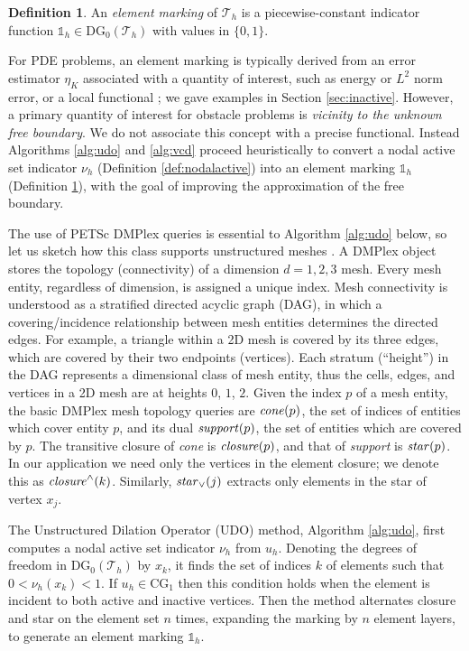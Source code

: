 \documentclass[]{interact}
\theoremstyle{plain}%
\theoremstyle{definition}
\newtheorem{definition}[theorem]{Definition}
\theoremstyle{remark}
\newcommand{\cT}{\mathcal{T}}
\newcommand{\CG}{\text{CG}}
\newcommand{\DG}{\text{DG}}
\newcommand{\oneh}{\mathbb{1}_h}
\begin{document}
\begin{definition} \label{def:marking}
An \emph{element marking} of $\cT_h$ is a piecewise-constant indicator function $\oneh \in \DG_0(\cT_h)$ with values in $\{0,1\}$.
\end{definition}

For PDE problems, an element marking is typically derived from an error estimator $\eta_K$ associated with a quantity of interest, such as energy or $L^2$ norm error, or a local functional \cite{BangerthRannacher2003}; we gave examples in Section \ref{sec:inactive}.  However, a primary quantity of interest for obstacle problems is \emph{vicinity to the unknown free boundary}.  We do not associate this concept with a precise functional.  Instead Algorithms \ref{alg:udo} and \ref{alg:vcd} proceed heuristically to convert a nodal active set indicator $\nu_h$ (Definition \ref{def:nodalactive}) into an element marking $\oneh$ (Definition \ref{def:marking}), with the goal of improving the approximation of the free boundary.

The use of PETSc DMPlex queries is essential to Algorithm \ref{alg:udo} below, so let us sketch how this class supports unstructured meshes \cite{Langeetal2016}.  A DMPlex object stores the topology (connectivity) of a dimension $d=1,2,3$ mesh.  Every mesh entity, regardless of dimension, is assigned a unique index.  Mesh connectivity is understood as a stratified directed acyclic graph (DAG), in which a covering/incidence relationship between mesh entities determines the directed edges.  For example, a triangle within a 2D mesh is covered by its three edges, which are covered by their two endpoints (vertices).  Each stratum (``height'') in the DAG represents a dimensional class of mesh entity, thus the cells, edges, and vertices in a 2D mesh are at heights $0$, $1$, $2$.  Given the index $p$ of a mesh entity, the basic DMPlex mesh topology queries \cite{petsc-user-ref} are $\text{\emph{cone}}(p)$, the set of indices of entities which cover entity $p$, and its dual $\text{\emph{support}}(p)$, the set of entities which are covered by $p$.  The transitive closure of \emph{cone} is $\text{\emph{closure}}(p)$, and that of \emph{support} is $\text{\emph{star}}(p)$.  In our application we need only the vertices in the element closure; we denote this as $\text{\emph{closure}}^\wedge(k)$.  Similarly, $\text{\emph{star}}_\vee(j)$ extracts only elements in the star of vertex $x_j$.

The Unstructured Dilation Operator (UDO) method, Algorithm \ref{alg:udo}, first computes a nodal active set indicator $\nu_h$ from $u_h$.  Denoting the degrees of freedom in $\DG_0(\cT_h)$ by $x_k$, it finds the set of indices $k$ of elements such that $0<\nu_h(x_k)<1$.  If $u_h \in \CG_1$ then this condition holds when the element is incident to both active and inactive vertices.  Then the method alternates closure and star on the element set $n$ times, expanding the marking by $n$ element layers, to generate an element marking $\oneh$.
\end{document}
